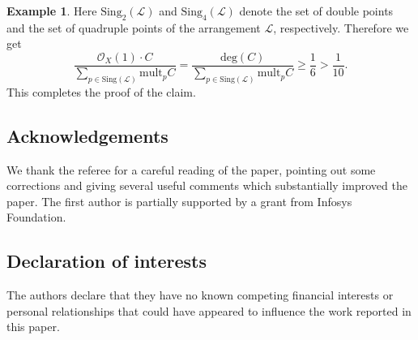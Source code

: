\documentclass[12pt,reqno]{amsart}
\theoremstyle{plain}
\numberwithin{equation}{section}
\theoremstyle{definition}
\newtheorem{example}[theorem]{Example}
\begin{document}
\begin{example}
Here $\text{Sing}_2(\mathcal{L})$ and $\text{Sing}_4(\mathcal{L})$ denote the set of double points and the set of quadruple points of the arrangement $\mathcal{L}$, respectively. Therefore we get 
		\[
		\frac{\mathcal{O}_X(1) \cdot C}{\sum\limits_{p \in \text{Sing}(\mathcal{L})} \text{mult}_{p}C} = \frac{\text{deg}(C)}{ \sum\limits_{p \in\text{Sing}(\mathcal{L})} \text{mult}_{p}C} \geq \frac{1}{6} > \frac{1}{10}.
		\]
		This completes the proof of the claim.

		
		
	\end{example}

 \subsection*{Acknowledgements} We thank the referee for a careful reading of the paper, pointing out some corrections and giving several useful comments which substantially improved the paper. The first author is partially supported by a grant from Infosys Foundation. 
	
\subsection*{Declaration of interests}
The authors declare that they have no known competing financial interests or personal relationships
that could have appeared to influence the work reported in this paper. 
		
\end{document}
